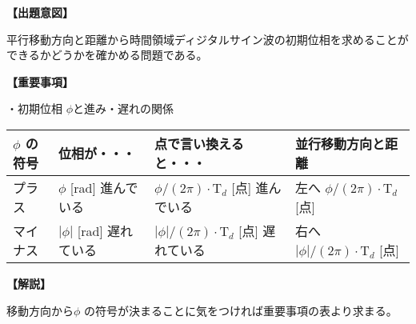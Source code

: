 \noindent \textbf{【出題意図】}

\bigskip
\noindent 平行移動方向と距離から時間領域ディジタルサイン波の初期位相を求めることができるかどうかを確かめる問題である。

\vspace{1em}
\noindent \textbf{【重要事項】}

\noindent ・初期位相 $\phi$と進み・遅れの関係

\medskip
\begin{center}
\small
\begin{tabularx}{0.9\fbwidth}{|X|X|X|X|}
\hline
$\phi$ の符号&  位相が・・・   & 点で言い換えると・・・   & 並行移動方向と距離 \\
\hline
プラス &  $\phi$ [rad] 進んでいる & $\phi/(2\pi) \cdot \textrm{T}_d$ [点] 進んでいる & 左へ $\phi/(2\pi) \cdot \textrm{T}_d$ [点] \\
\hline
マイナス &  $|\phi|$ [rad] 遅れている & $|\phi|/(2\pi) \cdot \textrm{T}_d$ [点] 遅れている & 右へ $|\phi|/(2\pi) \cdot \textrm{T}_d$ [点] \\
\hline
\end{tabularx}
\end{center}

\bigskip

\vspace{1em}
\noindent \textbf{【解説】}

\bigskip
\noindent 移動方向から$\phi$ の符号が決まることに気をつければ重要事項の表より求まる。
